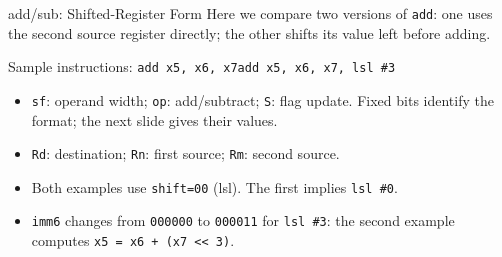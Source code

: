 \documentclass[aspectratio=169,11pt,t]{beamer}
\newcommand{\code}[1]{\texttt{#1}}
\newcommand{\bfld}[5]{%
  \pgfmathsetmacro{\cx}{#1 + #3/2}%
  \fill[#5] (#1,#2) rectangle ++(#3,0.72);%
  \draw[navy,line width=0.7pt] (#1,#2) rectangle ++(#3,0.72);%
  \node[font=\scriptsize\ttfamily,text height=1.5ex,text depth=0.35ex,align=center,text=darkgray] at (\cx,#2+0.36) {#4};%
}
\newcommand{\bitnote}[3]{%
  \node[font=\tiny,text height=1.5ex,text depth=0.35ex,align=center,text=darkgray] at (#1,#2) {#3};%
}
\begin{document}
\begin{frame}{add/sub: Shifted-Register Form}
\small
Here we compare two versions of \code{add}: one uses the second source register directly; the other shifts its value left before adding.

\begin{center}
\small Sample instructions: \code{add x5, x6, x7}\qquad\code{add x5, x6, x7, lsl \#3}
\end{center}

\vspace{0.1cm}

\begin{center}
\end{center}

\vspace{0.15cm}

\begin{itemize}\setlength{\itemsep}{4pt}
  \item \code{sf}: operand width; \code{op}: add/subtract; \code{S}: flag update. Fixed bits identify the format; the next slide gives their values.
  \item \code{Rd}: destination; \code{Rn}: first source; \code{Rm}: second source.
  \item Both examples use \code{shift=00} (lsl). The first implies \code{lsl \#0}.
  \item \code{imm6} changes from \code{000000} to \code{000011} for \code{lsl \#3}: the second example computes \code{x5 = x6 + (x7 << 3)}.
\end{itemize}

\end{frame}

\end{document}
